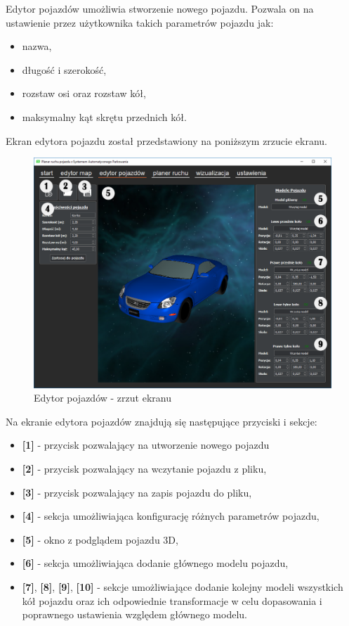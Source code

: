 \documentclass[a4paper,11pt,twoside]{report}
\theoremstyle{definition}
\begin{document}
Edytor pojazdów umożliwia stworzenie nowego pojazdu. Pozwala on na ustawienie przez użytkownika takich parametrów pojazdu jak:
\begin{itemize}
	\item nazwa,
	\item długość i szerokość,
	\item rozstaw osi oraz rozstaw kół,
	\item maksymalny kąt skrętu przednich kół.
\end{itemize}

Ekran edytora pojazdu został przedstawiony na poniższym zrzucie ekranu.

\begin{figure}[h!]
\centering
\includegraphics[scale=0.5]{instructionVehicleEditor}
\caption[Edytor pojazdów - zrzut ekranu]{Edytor pojazdów - zrzut ekranu}
\end{figure}

Na ekranie edytora pojazdów znajdują się następujące przyciski i sekcje:
\begin{itemize}
	\item \textbf{[1]} - przycisk pozwalający na utworzenie nowego pojazdu
	\item \textbf{[2]} - przycisk pozwalający na wczytanie pojazdu z pliku,
	\item \textbf{[3]} - przycisk pozwalający na zapis pojazdu do pliku,
	\item \textbf{[4]} - sekcja umożliwiająca konfigurację różnych parametrów pojazdu,
	\item \textbf{[5]} - okno z podglądem pojazdu 3D,
	\item \textbf{[6]} - sekcja umożliwiająca dodanie głównego modelu pojazdu,
	\item \textbf{[7]}, \textbf{[8]}, \textbf{[9]}, \textbf{[10]} - sekcje umożliwiające dodanie kolejny modeli wszystkich kół pojazdu oraz ich odpowiednie transformacje w celu dopasowania i poprawnego ustawienia względem głównego modelu.
\end{itemize}
\end{document}
